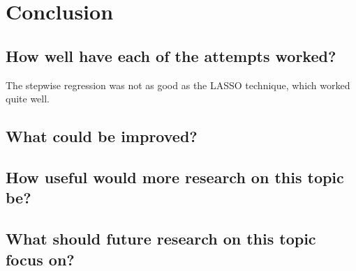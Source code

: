 
\chapter{Conclusion}

\section{How well have each of the attempts worked?}

\begin{todo}
    The stepwise regression was not as good as the LASSO technique, which worked quite well.
\end{todo}

\section{What could be improved?}

\section{How useful would more research on this topic be?}

\section{What should future research on this topic focus on?}
